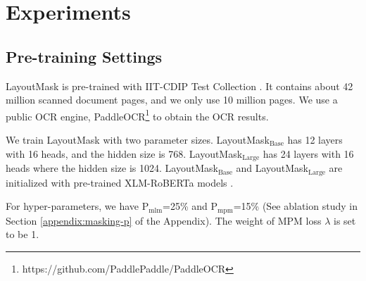 \documentclass[11pt]{article}
\begin{document}
\section{Experiments}

\subsection{Pre-training Settings}
LayoutMask is pre-trained with IIT-CDIP Test Collection \citep{IIT-CDIP-lewis2006building}.
It contains about 42 million scanned document pages, and we only use 10 million pages. 
We use a public OCR engine, PaddleOCR\footnote{https://github.com/PaddlePaddle/PaddleOCR} to obtain the OCR results.  

We train LayoutMask with two parameter sizes. LayoutMask$_\mathrm{Base}$ has 12 layers with 16 heads, and the hidden size is 768.
LayoutMask$_\mathrm{Large}$ has 24 layers with 16 heads where the hidden size is 1024.
LayoutMask$_\mathrm{Base}$ and LayoutMask$_\mathrm{Large}$ are initialized with pre-trained XLM-RoBERTa models \citep{conneau2020unsupervised}.

For hyper-parameters, we have $\mathrm{P}_\mathrm{mlm}$=25\% and $\mathrm{P}_\mathrm{mpm}$=15\% (See ablation study in Section \ref{appendix:masking-p} of the Appendix). The weight of MPM loss $\lambda$ is set to be 1.
\end{document}
